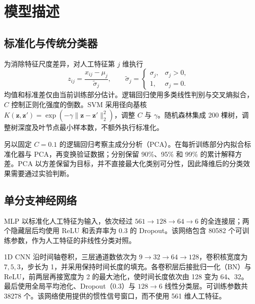 \section{模型描述}
\subsection{标准化与传统分类器}
为消除特征尺度差异，对人工特征第 $j$ 维执行
\begin{equation}
 z_{ij}=\frac{x_{ij}-\mu_j}{\widetilde\sigma_j},\qquad
 \widetilde\sigma_j=\begin{cases}\sigma_j,&\sigma_j>0,\\1,&\sigma_j=0.\end{cases}
\end{equation}
均值和标准差仅由当前训练部分估计。逻辑回归使用多类线性判别与交叉熵拟合，$C$ 控制正则化强度的倒数。SVM 采用径向基核 $K(\boldsymbol{z},\boldsymbol{z}')=\exp(-\gamma\|\boldsymbol{z}-\boldsymbol{z}'\|_2^2)$，调整 $C$ 与 $\gamma$\cite{cortes1995}。随机森林集成 200 棵树，调整树深度及叶节点最小样本数，不额外执行标准化\cite{breiman2001}。

另以固定 $C=0.1$ 的逻辑回归考察主成分分析（PCA）。在每折训练部分内拟合标准化器与 PCA，再变换验证数据；分别保留 90\%、95\% 和 99\% 的累计解释方差。PCA 以方差保留为目标，并不直接最大化类别可分性\cite{jolliffe2016}，因此降维后的分类效果需要通过实验判断。

\subsection{单分支神经网络}
MLP 以标准化人工特征为输入，依次经过 $561\to128\to64\to6$ 的全连接层；两个隐藏层后均使用 ReLU 和丢弃率为 0.3 的 Dropout\cite{dropout2014}。该网络包含 80582 个可训练参数，作为人工特征的非线性分类对照。

1D CNN 沿时间轴卷积，三层通道数依次为 $9\to32\to64\to128$，卷积核宽度为 $7,5,3$，步长为 1，并采用保持时间长度的填充。各卷积层后接批归一化（BN）\cite{ioffe2015}与 ReLU，前两层再接宽度为 2 的最大池化，使时间长度依次由 128 变为 64、32。最后使用全局平均池化、Dropout（0.3）与 $128\to6$ 线性分类层。可训练参数共 38278 个。该网络使用提供的惯性信号窗口，而不使用 561 维人工特征。


